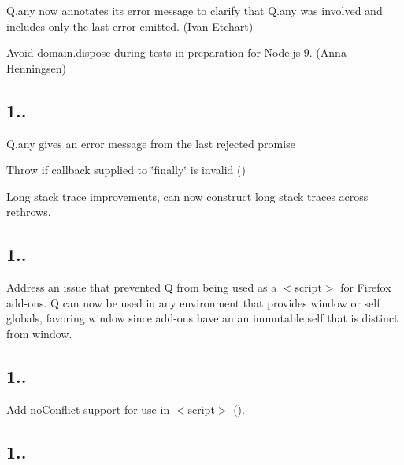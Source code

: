 
\begin{DoxyItemize}
\item Q.\+any now annotates its error message to clarify that Q.\+any was involved and includes only the last error emitted. (Ivan Etchart)
\item Avoid domain.\+dispose during tests in preparation for Node.\+js 9. (Anna Henningsen)
\end{DoxyItemize}

\subsection*{1..}


\begin{DoxyItemize}
\item Q.\+any gives an error message from the last rejected promise
\item Throw if callback supplied to \char`\"{}finally\char`\"{} is invalid ()
\item Long stack trace improvements, can now construct long stack traces across rethrows.
\end{DoxyItemize}

\subsection*{1..}


\begin{DoxyItemize}
\item Address an issue that prevented Q from being used as a {\ttfamily $<$script$>$} for Firefox add-\/ons. Q can now be used in any environment that provides {\ttfamily window} or {\ttfamily self} globals, favoring {\ttfamily window} since add-\/ons have an an immutable {\ttfamily self} that is distinct from {\ttfamily window}.
\end{DoxyItemize}

\subsection*{1..}


\begin{DoxyItemize}
\item Add {\ttfamily no\+Conflict} support for use in {\ttfamily $<$script$>$} ().
\end{DoxyItemize}

\subsection*{1..}


